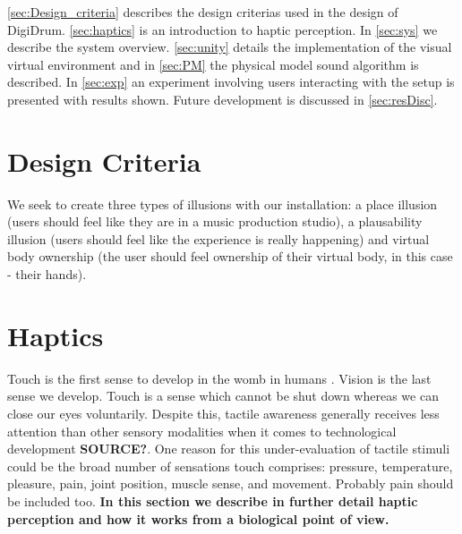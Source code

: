 \documentclass{vgtc}
\begin{document}
\autoref{sec:Design_criteria} describes the design criterias used in the design of DigiDrum.
\autoref{sec:haptics} is an introduction to haptic perception. 
In \autoref{sec:sys} we describe the system overview. \autoref{sec:unity} details the implementation of the visual virtual environment and in \autoref{sec:PM} the physical model sound algorithm is described. 
In \autoref{sec:exp} an experiment involving users interacting with the setup is presented with results shown. Future development is discussed in \autoref{sec:resDisc}.


\section{Design Criteria}\label{sec:Design_criteria}

We seek to create three types of illusions with our installation: a place illusion (users should feel like they are in a music production studio), a plausability illusion (users should feel like the experience is really happening) and virtual body ownership (the user should feel ownership of their virtual body, in this case - their hands). 

\section{Haptics}\label{sec:haptics}
Touch is the first sense to develop in the womb in humans \cite{Barnett1972}. Vision is the last sense we develop. Touch is a sense which cannot be shut down whereas we can close our eyes voluntarily. Despite this, tactile awareness generally receives less attention than other sensory modalities when it comes to technological development \textbf{SOURCE?}. One reason for this under-evaluation of tactile stimuli could be the broad number of sensations touch comprises: pressure, temperature, pleasure, pain, joint position, muscle sense, and movement. Probably pain should be included too. \textbf{In this section we describe in further detail haptic perception and how it works from a biological point of view.}
\end{document}
